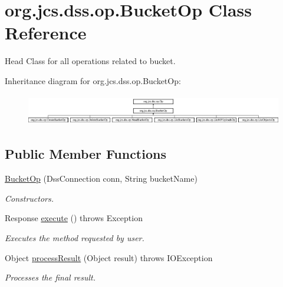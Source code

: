 \hypertarget{classorg_1_1jcs_1_1dss_1_1op_1_1BucketOp}{}\section{org.\+jcs.\+dss.\+op.\+Bucket\+Op Class Reference}
\label{classorg_1_1jcs_1_1dss_1_1op_1_1BucketOp}


Head Class for all operations related to bucket.  


Inheritance diagram for org.\+jcs.\+dss.\+op.\+Bucket\+Op\+:\begin{figure}[H]
\begin{center}
\leavevmode
\includegraphics[height=1.372549cm]{classorg_1_1jcs_1_1dss_1_1op_1_1BucketOp}
\end{center}
\end{figure}
\subsection*{Public Member Functions}
\begin{DoxyCompactItemize}
\item 
\hyperlink{classorg_1_1jcs_1_1dss_1_1op_1_1BucketOp_ab023608e035a18fc468451ba2a65e049}{Bucket\+Op} (Dss\+Connection conn, String bucket\+Name)\hypertarget{classorg_1_1jcs_1_1dss_1_1op_1_1BucketOp_ab023608e035a18fc468451ba2a65e049}{}\label{classorg_1_1jcs_1_1dss_1_1op_1_1BucketOp_ab023608e035a18fc468451ba2a65e049}

\begin{DoxyCompactList}\small\item\em Constructors. \end{DoxyCompactList}\item 
Response \hyperlink{classorg_1_1jcs_1_1dss_1_1op_1_1BucketOp_a192b45bd81daa20a4e091f756d5df36c}{execute} ()  throws Exception 
\begin{DoxyCompactList}\small\item\em Executes the method requested by user. \end{DoxyCompactList}\item 
Object \hyperlink{classorg_1_1jcs_1_1dss_1_1op_1_1BucketOp_a0fd5f6a5286e3347f539a344480caadc}{process\+Result} (Object result)  throws I\+O\+Exception\hypertarget{classorg_1_1jcs_1_1dss_1_1op_1_1BucketOp_a0fd5f6a5286e3347f539a344480caadc}{}\label{classorg_1_1jcs_1_1dss_1_1op_1_1BucketOp_a0fd5f6a5286e3347f539a344480caadc}

\begin{DoxyCompactList}\small\item\em Processes the final result. \end{DoxyCompactList}\end{DoxyCompactItemize}
